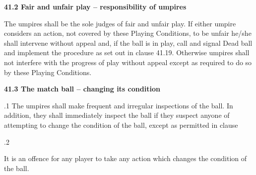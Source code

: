 \documentclass[12pt]{article}
\begin{document}
\vspace{\baselineskip}
\begin{Center}
{\fontsize{8pt}{9.6pt}\par}
\end{Center}\par


\vspace{\baselineskip}
{\fontsize{11pt}{13.2pt}\selectfont \textbf{41.2 \tabto{0.47in} Fair and unfair play – responsibility of umpires}\par}\par


\vspace{\baselineskip}
\begin{adjustwidth}{0.0in}{0.01in}
{\fontsize{9pt}{10.8pt}\selectfont The umpires shall be the sole judges of fair and unfair play. If either umpire considers an action, not covered by these Playing Conditions, to be unfair he/she shall intervene without appeal and, if the ball is in play, call and signal Dead ball and implement the procedure as set out in clause 41.19. Otherwise umpires shall not interfere with the progress of play without appeal except as required to do so by these Playing Conditions.\par}\par

\end{adjustwidth}


\vspace{\baselineskip}
{\fontsize{11pt}{13.2pt}\selectfont \textbf{41.3 \tabto{0.47in} The match ball – changing its condition}\par}\par


\vspace{\baselineskip}
\begin{adjustwidth}{0.5in}{0.07in}
{\fontsize{9pt}{10.8pt}.1 \tabto{0.49in} The umpires shall make frequent and irregular inspections of the ball. In addition, they shall immediately inspect the ball if they suspect anyone of attempting to change the condition of the ball, except as permitted in clause \par}\par

\end{adjustwidth}


\vspace{\baselineskip}
{\fontsize{9pt}{10.8pt}.2 \tabto{0.49in} {\fontsize{8pt}{9.6pt}\selectfont It is an offence for any player to take any action which changes the condition of the ball.\par}\par}\par
\end{document}
